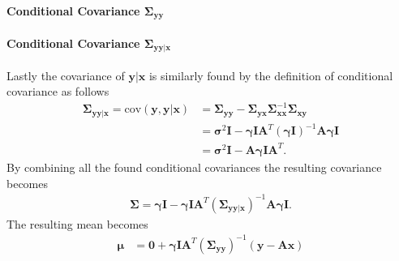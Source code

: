 \paragraph{Conditional Covariance $\boldsymbol{\Sigma}_{\mathbf{yy}}$}

\paragraph{Conditional Covariance $\boldsymbol{\Sigma}_{\mathbf{yy} \vert \mathbf{x}}$}
Lastly the covariance of $\mathbf{y} \vert \mathbf{x}$ is similarly found by the definition of conditional covariance as follows 
\begin{align*}
\boldsymbol{\Sigma}_{\mathbf{yy} \vert \mathbf{x}} =  \text{cov} ( \mathbf{y} , \mathbf{y} \vert \mathbf{x}) &= \boldsymbol{\Sigma}_{\mathbf{yy}} - \boldsymbol{\Sigma}_{\mathbf{yx}} \boldsymbol{\Sigma}_{\mathbf{xx}}^{-1} \boldsymbol{\Sigma}_{\mathbf{xy}} \\
&= \boldsymbol{\sigma}^2 \mathbf{I} - \boldsymbol{\gamma} \mathbf{I} \mathbf{A}^T (\boldsymbol{\gamma} \mathbf{I})^{-1} \mathbf{A} \boldsymbol{\gamma} \mathbf{I} \\
&= \boldsymbol{\sigma}^2 \mathbf{I} - \mathbf{A} \boldsymbol{\gamma}\mathbf{I} \mathbf{A}^T.
\end{align*} 
By combining all the found conditional covariances the resulting covariance becomes 
\begin{align*}
\boldsymbol{\Sigma} = \boldsymbol{\gamma} \mathbf{I} - \boldsymbol{\gamma} \mathbf{I} \mathbf{A}^T (\boldsymbol{\Sigma}_{\mathbf{yy} \vert \mathbf{x}})^{-1} \mathbf{A} \boldsymbol{\gamma} \mathbf{I}.
\end{align*}
The resulting mean becomes
\begin{align*}
\boldsymbol{\mu} &= \mathbf{0} + \boldsymbol{\gamma} \mathbf{I} \mathbf{A}^T \left( \boldsymbol{\Sigma}_{\mathbf{yy}} \right)^{-1} \left(\mathbf{y} - \mathbf{Ax}\right)
\end{align*}  
